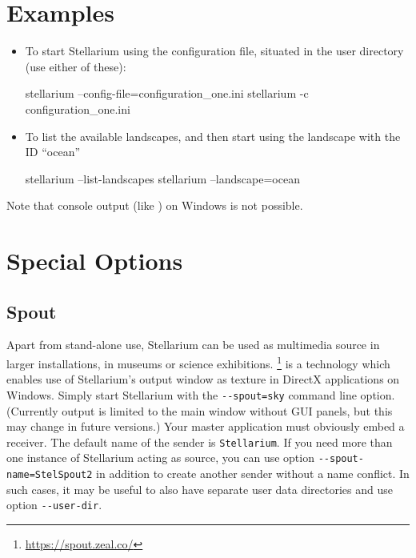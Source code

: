 \section{Examples}
\label{sec:CommandLineOptions:Examples}

\begin{itemize}
\item To start Stellarium using the configuration file,
   situated in the user directory (use either of
  these):

\begin{commands}
stellarium --config-file=configuration_one.ini
stellarium -c configuration_one.ini
\end{commands}

\item To list the available landscapes, and then start using the
  landscape with the ID ``ocean''
\begin{commands}
stellarium --list-landscapes 
stellarium --landscape=ocean
\end{commands}
\end{itemize}

\noindent Note that console output (like ) on Windows is not possible. 

\section{Special Options}
\label{sec:CommandLineOptions:Special}
\subsection{Spout} 
\label{sec:CommandLineOptions:Special:Spout}
Apart from stand-alone use, Stellarium can be used as multimedia source in larger installations, in museums or science exhibitions. 
\footnote{\url{https://spout.zeal.co/}} is a technology which enables use of Stellarium's 
output window as texture in DirectX applications on Windows. Simply start Stellarium with 
the \texttt{-\/-spout=sky} command line option. (Currently  output is limited to the main window 
without GUI panels, but this may change in future versions.) 
Your master application must obviously embed a  receiver. 
The default name of the  sender is \texttt{Stellarium}. If you need more than one instance of Stellarium acting as source, 
you can use option \texttt{-\/-spout-name=StelSpout2} in addition to create another  sender without a name conflict. 
In such cases, it may be useful to also have separate user data directories and use option \texttt{-\/-user-dir}. 

